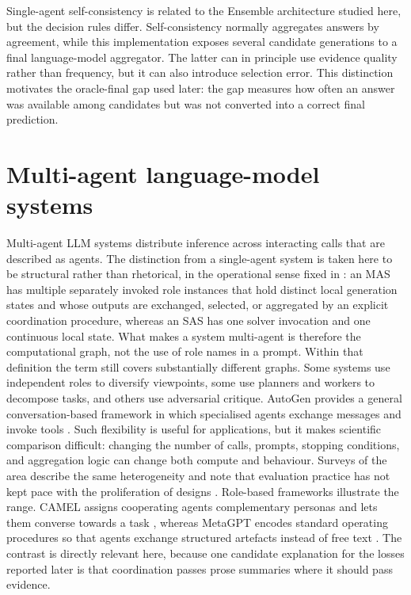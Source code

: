 Single-agent self-consistency is related to the Ensemble architecture studied here, but the decision rules differ. Self-consistency normally aggregates answers by agreement, while this implementation exposes several candidate generations to a final language-model aggregator. The latter can in principle use evidence quality rather than frequency, but it can also introduce selection error. This distinction motivates the oracle-final gap used later: the gap measures how often an answer was available among candidates but was not converted into a correct final prediction.

\section{Multi-agent language-model systems}

Multi-agent LLM systems distribute inference across interacting calls that are described as agents. The distinction from a single-agent system is taken here to be structural rather than rhetorical, in the operational sense fixed in : an MAS has multiple separately invoked role instances that hold distinct local generation states and whose outputs are exchanged, selected, or aggregated by an explicit coordination procedure, whereas an SAS has one solver invocation and one continuous local state. What makes a system multi-agent is therefore the computational graph, not the use of role names in a prompt. Within that definition the term still covers substantially different graphs. Some systems use independent roles to diversify viewpoints, some use planners and workers to decompose tasks, and others use adversarial critique. AutoGen provides a general conversation-based framework in which specialised agents exchange messages and invoke tools \citep{wu2023autogen}. Such flexibility is useful for applications, but it makes scientific comparison difficult: changing the number of calls, prompts, stopping conditions, and aggregation logic can change both compute and behaviour. Surveys of the area describe the same heterogeneity and note that evaluation practice has not kept pace with the proliferation of designs \citep{guo2024survey}. Role-based frameworks illustrate the range. CAMEL assigns cooperating agents complementary personas and lets them converse towards a task \citep{li2023camel}, whereas MetaGPT encodes standard operating procedures so that agents exchange structured artefacts instead of free text \citep{hong2024metagpt}. The contrast is directly relevant here, because one candidate explanation for the losses reported later is that coordination passes prose summaries where it should pass evidence.

